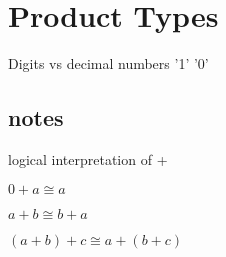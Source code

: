 \documentclass[DaoFP]{subfiles}
\begin{document}
\setcounter{chapter}{3}

\chapter{Product Types}

Digits vs decimal numbers '1' '0'
\section{notes}

logical interpretation  of + 

$0 + a \cong a$

$a + b \cong b + a$
 
$(a + b) + c \cong a + (b + c)$

\begin{haskell}
\end{haskell}
\end{document}
